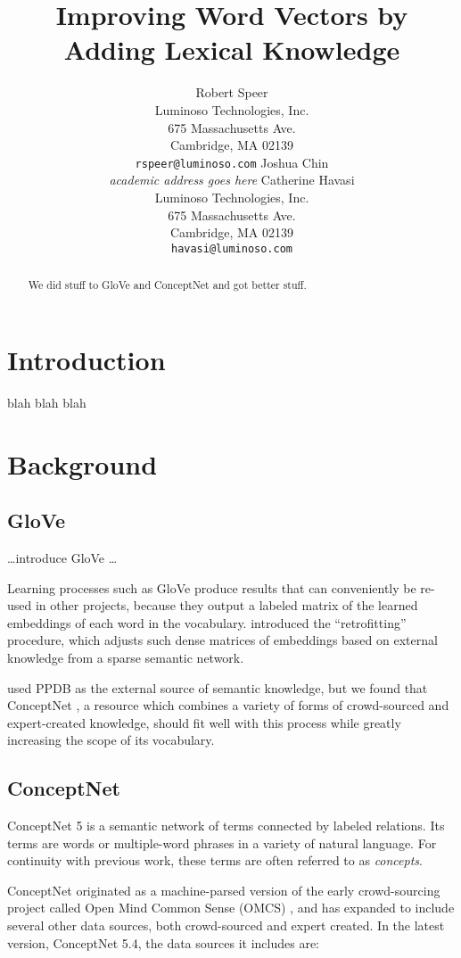 \documentclass[letterpaper]{article}
\title{Improving Word Vectors by Adding Lexical Knowledge}
\author{Robert Speer\\
    Luminoso Technologies, Inc.\\
    675 Massachusetts Ave.\\
    Cambridge, MA 02139\\
    \texttt{rspeer@luminoso.com}
\And
    Joshua Chin\\
    {\em academic address goes here}
\And
    Catherine Havasi\\
    Luminoso Technologies, Inc.\\
    675 Massachusetts Ave.\\
    Cambridge, MA 02139\\
    \texttt{havasi@luminoso.com}
}
\begin{document}
\maketitle
\begin{abstract}
We did stuff to GloVe and ConceptNet and got better stuff.
\end{abstract}

\section{Introduction}
blah blah blah

\section{Background}

\subsection{GloVe}
\ldots introduce GloVe \ldots %

Learning processes such as GloVe produce results that can conveniently be
re-used in other projects, because they output a labeled matrix of the learned
embeddings of each word in the vocabulary.
\citeauthor{faruqui2014retrofitting} 
introduced the ``retrofitting'' procedure, which adjusts such dense matrices of
embeddings based on external knowledge from a sparse semantic network.

\citeauthor{faruqui2014retrofitting} used PPDB \cite{ganitkevitch2013ppdb} as
the external source of semantic knowledge, but we found that ConceptNet
\cite{speer2012conceptnet}, a resource which combines a variety of forms of
crowd-sourced and expert-created knowledge, should fit well with this process
while greatly increasing the scope of its vocabulary.

\subsection{ConceptNet}
ConceptNet 5 \cite{speer2012conceptnet} is a semantic network of terms
connected by labeled relations. Its terms are words or multiple-word phrases
in a variety of natural language. For continuity with previous work,
these terms are often referred to as {\em concepts}.

ConceptNet originated as a machine-parsed version of the early crowd-sourcing
project called Open Mind Common Sense (OMCS) \cite{singh2002omcs}, and has expanded
to include several other data sources, both crowd-sourced and expert created.
In the latest version, ConceptNet 5.4, the data sources it includes are:
\end{document}
